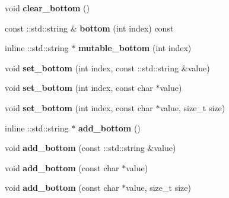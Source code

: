\begin{DoxyCompactItemize}
void {\bfseries clear\+\_\+bottom} ()
\item 
\mbox{\label{classcaffe_1_1_layer_parameter_abaf48f881cfd2298a45f7f7afd4d31fe}} 
const \+::std\+::string \& {\bfseries bottom} (int index) const
\item 
\mbox{\label{classcaffe_1_1_layer_parameter_a1390b706685182a3649a4a8d8024c394}} 
inline \+::std\+::string $\ast$ {\bfseries mutable\+\_\+bottom} (int index)
\item 
\mbox{\label{classcaffe_1_1_layer_parameter_a9d3f5acf205d3495f557317a0e727b9b}} 
void {\bfseries set\+\_\+bottom} (int index, const \+::std\+::string \&value)
\item 
\mbox{\label{classcaffe_1_1_layer_parameter_a15f5fd591fbba0e146486d14fda2d451}} 
void {\bfseries set\+\_\+bottom} (int index, const char $\ast$value)
\item 
\mbox{\label{classcaffe_1_1_layer_parameter_af5d00e4d7da6f447ad8fdaea455bfa7a}} 
void {\bfseries set\+\_\+bottom} (int index, const char $\ast$value, size\+\_\+t size)
\item 
\mbox{\label{classcaffe_1_1_layer_parameter_aee9a0a1fc8fd5acf648a529eed74abc0}} 
inline \+::std\+::string $\ast$ {\bfseries add\+\_\+bottom} ()
\item 
\mbox{\label{classcaffe_1_1_layer_parameter_a8e3014824ed76e3fb3ae7be130bda741}} 
void {\bfseries add\+\_\+bottom} (const \+::std\+::string \&value)
\item 
\mbox{\label{classcaffe_1_1_layer_parameter_a6019a790be9ed7fa0410aec4d6e54891}} 
void {\bfseries add\+\_\+bottom} (const char $\ast$value)
\item 
\mbox{\label{classcaffe_1_1_layer_parameter_ad1ef3998681e7829f7c45a0602c5c8a3}} 
void {\bfseries add\+\_\+bottom} (const char $\ast$value, size\+\_\+t size)
\item 
\mbox{\label{classcaffe_1_1_layer_parameter_a9683ed9664069f9a08c758ed023d8e66}} 

\end{DoxyCompactItemize}
